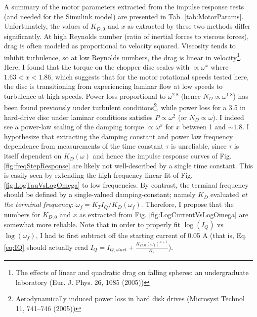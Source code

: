 \documentclass[11pt]{article} %
\begin{document}
A summary of the motor parameters extracted from the impulse response tests (and needed for the Simulink model) are presented in Tab. \ref{tab:MotorParams}. Unfortunately, the values of $K_{D,0}$ and $x$ as extracted by these two methods differ significantly. At high Reynolds number (ratio of inertial forces to viscous forces), drag is often modeled as proportional to velocity squared. Viscosity tends to inhibit turbulence, so at low Reynolds numbers, the drag is linear in velocity\footnote{The effects of linear and quadratic drag on falling spheres: an undergraduate laboratory (Eur. J. Phys. 26, 1085 (2005))}. Here, I found that the torque on the chopper disc scales with $\propto \omega^x$ where $1.63 < x < 1.86$, which suggests that for the motor rotational speeds tested here, the disc is transitioning from experiencing laminar flow at low speeds to turbulence at high speeds. Power loss proportional to $\omega^{2.8}$ (hence $N_D \propto \omega^{1.8}$) has been found previously under turbulent conditions\footnote{Aerodynamically induced power loss in hard disk drives (Microsyst Technol 11, 741–746 (2005))}, while power loss for a 3.5 in hard-drive disc under laminar conditions satisfies $P \propto \omega^2$ (or $N_D \propto \omega$). I indeed see a power-law scaling of the damping torque $\propto \omega^x$ for $x$ between 1 and $\sim1.8$. I hypothesize that extracting the damping constant and power law frequency dependence from measurements of the time constant $\tau$ is unreliable, since $\tau$ is itself dependent on $K_D(\omega)$ and hence the impulse response curves of Fig. \ref{fig:freqStepResponse} are likely not well-described by a single time constant. This is easily seen by extending the high frequency linear fit of Fig. \ref{fig:LogTauVsLogOmega} to low frequencies. By contrast, the terminal frequency should be defined by a single-valued damping-constant; namely $K_D$ evaluated \textit{at the terminal frequency}: $\omega_f = K_T I_Q/K_D(\omega_f)$. Therefore, I propose that the numbers for $K_{D,0}$ and $x$ as extracted from Fig. \ref{fig:LogCurrentVsLogOmega} are somewhat more reliable. Note that in order to properly fit $\log(I_Q)$ vs $\log(\omega_f)$, I had to first subtract off the starting current of 0.05 A (that is, Eq. \ref{eq:IQ} should actually read $I_Q = I_{Q,start} + \frac{K_{D,0} (\omega_f)^{x+1}}{K_T}$).
\end{document}
